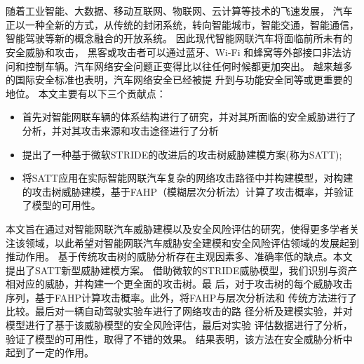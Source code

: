 \vspace{-2.5cm}
\chapter*{\xiaosan {}}
\hspace{-0.5cm}
随着工业智能、大数据、移动互联网、物联网、云计算等技术的飞速发展，
汽车正以一种全新的方式，从传统的封闭系统，转向智能城市，智能交通，智能通信，智能驾驶等新的概念融合的开放系统。
因此现代智能网联汽车将面临前所未有的安全威胁和攻击，
黑客或攻击者可以通过蓝牙、Wi-Fi 和蜂窝等外部接口非法访问和控制车辆。汽车网络安全问题正变得比以往任何时候都更加突出。
越来越多的国际安全标准也表明，汽车网络安全已经被提
升到与功能安全同等或更重要的地位。
本文主要有以下三个贡献点：
\begin{itemize}
    \item 首先对智能网联车辆的体系结构进行了研究，并对其所面临的安全威胁进行了分析，并对其攻击来源和攻击途径进行了分析
    \item 提出了一种基于微软STRIDE的改进后的攻击树威胁建模方案(称为SATT);
    \item 将SATT应用在实际智能网联汽车复杂的网络攻击路径中并构建模型，对构建的攻击树威胁建模，基于FAHP（模糊层次分析法）计算了攻击概率，并验证了模型的可用性。
  \end{itemize}
本文旨在通过对智能网联汽车威胁建模以及安全风险评估的研究，使得更多学者关注该领域，以此希望对智能网联汽车威胁安全建模和安全风险评估领域的发展起到推动作用。
基于传统攻击树的威胁分析存在主观因素多、准确率低的缺点。本文提出了SATT新型威胁建模方案。
借助微软的STRIDE威胁模型，我们识别与资产相对应的威胁，并构建一个更全面的攻击树。最
后，对于攻击树的每个威胁攻击序列，基于FAHP计算攻击概率。此外，将FAHP与层次分析法和
传统方法进行了比较。最后对一辆自动驾驶实验车进行了网络攻击的路
径分析及建模实验，并对模型进行了基于该威胁模型的安全风险评估，最后对实验
评估数据进行了分析，验证了模型的可用性，取得了不错的效果。
结果表明，该方法在安全威胁分析中起到了一定的作用。

 